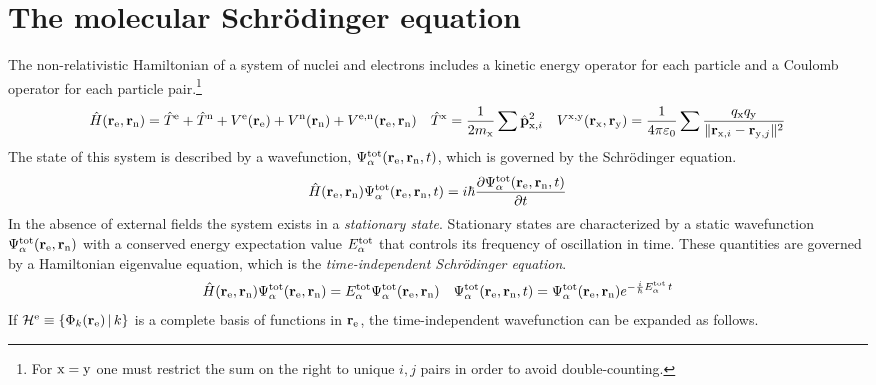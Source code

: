 \documentclass[11pt]{article}
\begin{document}
\setlength{\abovedisplayskip}{5pt}
\setlength{\belowdisplayskip}{5pt}


\section*{The molecular Schr\"odinger equation}

\begin{rmk}
The non-relativistic Hamiltonian of a system of nuclei and electrons includes a kinetic energy operator for each particle and a Coulomb operator for each particle pair.\footnote{
  For $\mathrm{x}=\mathrm{y}$ one must restrict the sum on the right to unique $i,j$ pairs in order to avoid double-counting.}
\begin{align}
  \op{H}(\bo{r}_\mr{e},\bo{r}_\mr{n})
=
  \op{T}^\mr{e}
+
  \op{T}^\mr{n}
+
  V^\mr{e}(\bo{r}_\mr{e})
+
  V^\mr{n}(\bo{r}_\mr{n})
+
  V^{\mr{e},\mr{n}}(\bo{r}_\mr{e},\bo{r}_\mr{n})
&&
  \op{T}^\mr{x}
=
  \fr{1}{2m_\mr{x}}
  \sum
  \op{\bo{p}}_{\mr{x},i}^2
&&
  V^{\mr{x},\mr{y}}(\bo{r}_\mr{x},\bo{r}_\mr{y})
=
  \fr{1}{4\pi \e_0}
  \sum
  \fr{
    q_\mr{x}q_\mr{y}
  }{
    \|\bo{r}_{\mr{x},i} - \bo{r}_{\mr{y},j}\|^2
  }
\end{align}
The state of this system is described by a wavefunction,
$\Psi _{\alpha }^{\mathrm{tot}}(\mathbf{r}_{\mathrm{e}},\mathbf{r}_{\mathrm{n}}, t)$, which is governed by the Schr\"odinger equation.
\begin{align}
  \hat{H}(\mathbf{r}_{\mathrm{e}},\mathbf{r}_{\mathrm{n}})
  \Psi _{\alpha }^{\mathrm{tot}}(\mathbf{r}_{\mathrm{e}},\mathbf{r}_{\mathrm{n}}, t)
=
  i
  \hbar
  \frac {\partial
    \Psi _{\alpha }^{\mathrm{tot}}(\mathbf{r}_{\mathrm{e}},\mathbf{r}_{\mathrm{n}}, t)
  }{\partial
    t
  }
\end{align}
In the absence of external fields the system exists in a \textit{stationary state}.
Stationary states are characterized by a static wavefunction $\Psi _{\alpha }^{\mathrm{tot}}(\mathbf{r}_{\mathrm{e}},\mathbf{r}_{\mathrm{n}})$ with a conserved energy expectation value $E_{\alpha }^{\mathrm{tot}}$ that controls its frequency of oscillation in time.
These quantities are governed by a Hamiltonian eigenvalue equation, which is the \textit{time-independent Schr\"odinger equation}.
\begin{align}
\label{eq:molecular-schrodinger-equation}
  \hat{H}(\mathbf{r}_{\mathrm{e}},\mathbf{r}_{\mathrm{n}})
  \Psi _{\alpha }^{\mathrm{tot}}(\mathbf{r}_{\mathrm{e}},\mathbf{r}_{\mathrm{n}})
=
  E_{\alpha }^{\mathrm{tot}}
  \Psi _{\alpha }^{\mathrm{tot}}(\mathbf{r}_{\mathrm{e}},\mathbf{r}_{\mathrm{n}})
&&
  \Psi _{\alpha }^{\mathrm{tot}}(\mathbf{r}_{\mathrm{e}},\mathbf{r}_{\mathrm{n}}, t)
=
  \Psi _{\alpha }^{\mathrm{tot}}(\mathbf{r}_{\mathrm{e}},\mathbf{r}_{\mathrm{n}})
  e^{-\frac {i}{\hbar}E_{\alpha }^{\mathrm{tot}}\,t}
\end{align}
If $\mathcal{H}^{\mathrm{e}}\equiv\{\Phi _k(\mathbf{r}_{\mathrm{e}})\,|\,k\}$ is a complete basis of functions in $\mathbf{r}_{\mathrm{e}}$, the time-independent wavefunction can be expanded as follows.\footnotemark

\end{rmk}
\end{document}
